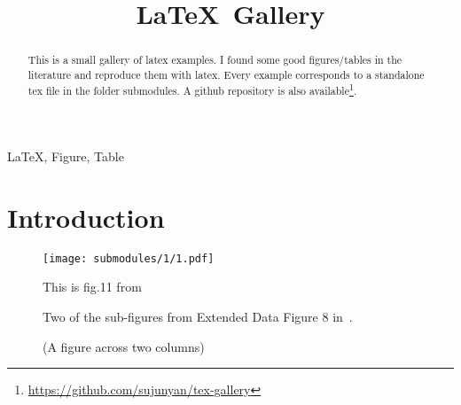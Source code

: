 \documentclass[conference]{IEEEtran}
\title{\LaTeX\, Gallery}
\author{
    \IEEEauthorblockN{Junyan Su}
    \IEEEauthorblockA{junyan.su@my.cityu.edu.hk}
}
\begin{document}
\maketitle

\begin{abstract}
    This is a small gallery of latex examples. I found some good figures/tables in the literature and reproduce them with latex. Every example corresponds to a standalone tex file in the folder submodules. A github repository is also available\footnote{\url{https://github.com/sujunyan/tex-gallery}}.
\end{abstract}


\begin{IEEEkeywords}
    \LaTeX , Figure, Table
\end{IEEEkeywords}

\section{Introduction}
\lipsum[1]

\begin{figure}[b]
    \begin{center}
        \texttt{[image: submodules/1/1.pdf]}
    \end{center} 
    \caption{This is fig.11 from~\cite{1}}
\end{figure}

\lipsum[1]
\begin{figure}[tb]
    \begin{center}
    \end{center} 
    \caption{Two of the sub-figures from Extended Data Figure 8 in~\cite{2}.}
\end{figure}

\begin{figure*}[htb]
    \begin{center}
        \subfigure[A subcaption]{
            
        }
        \subfigure[A subcaption]{
            
        }
    \end{center} 
    \caption{(A figure across two columns)}
\end{figure*}
\end{document}
